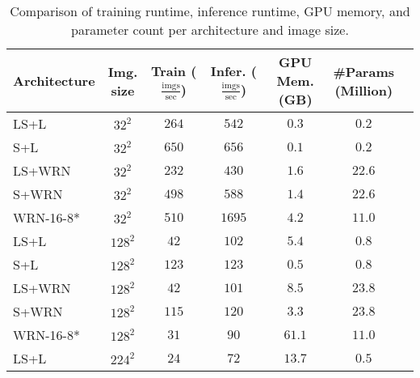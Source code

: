 \documentclass[10pt,twocolumn,letterpaper]{article}
\begin{document}
\begin{table}
    \caption{Comparison of training runtime, inference runtime, GPU memory, and parameter count per architecture and image size.  \\ \vspace{-20pt}}
    \centering
    \small
    \label{table:complexity}
      \fontsize{8}{8}\selectfont 
    {\begin{tabular}{lcccccl}
    \hline 
    Architecture &\parbox{10pt}{Img.\\ size} & \parbox{10pt}{Train\\($\frac{\text{imgs}}{\text{sec}}$)}	& \parbox{10pt}{Infer.\\($\frac{\text{imgs}}{\text{sec}}$)} & \parbox{10pt}{\scriptsize{}GPU Mem.\\(GB)} & \parbox{25pt}{\#Params\\(Million)} & \\
    \hline 
    LS+L  & $32^2$ & $264$ &	$542$ & $	0.3	$	&	$0.2$ & \\
    S+L & $32^2$ &	$650$ &	$656$ & $	0.1	$	& $0.2$ & \\
    LS+WRN  & $32^2$& $232$ & $430$	& $	1.6	$	& $22.6$ & \\
    S+WRN  & $32^2$ & $498$ & $588$ & 
    $	1.4	$	& $22.6$ & \\
    WRN-16-8*	& $32^2$ &	$510$ &	$1695$ & 
    $	4.2	$	& $11.0$ & \\\hline
    LS+L  & $128^2$ &	$42$ &	$102$ & 
    $	5.4	$	&	$0.8$ & \\
    S+L & $128^2$ &	$123$ &	$123$ & 
    $	0.5	$	&	$0.8$ & \\
    LS+WRN & $128^2$ & $42$ &	$101$ &  $	8.5	$	&	$23.8$ & \\
    S+WRN & $128^2$ &	$115$ &	$120$ & 
    $	3.3	$	&	$23.8$ & \\
    WRN-16-8* & $128^2$	& $31$ & $90$ & 
    $	61.1	$	&	$11.0$ & \\\hline
    LS+L & $224^2$ & $24$	& $72$ & 
    $	13.7	$	& $0.5$ & \\

\end{tabular}}
\end{table}
\end{document}
